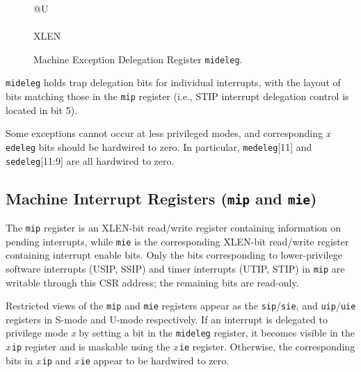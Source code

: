 \begin{figure}[h!]
{\footnotesize
\begin{center}
\begin{tabular}{@{}U}
 \\
\hline
{} \\
\hline
XLEN \\
\end{tabular}
\end{center}
}
\vspace{-0.1in}
\caption{Machine Exception Delegation Register {\tt mideleg}.}
\label{midelegreg}
\end{figure}

{\tt mideleg} holds trap delegation bits for individual interrupts, with the
layout of bits matching those in the {\tt mip} register (i.e., STIP interrupt
delegation control is located in bit 5).

Some exceptions cannot occur at less privileged modes, and corresponding
{\em x}\,{\tt edeleg} bits should be hardwired to zero.  In particular,
{\tt medeleg}[11] and {\tt sedeleg}[11:9] are all hardwired to zero.

\subsection{Machine Interrupt Registers ({\tt mip} and {\tt mie})}

The {\tt mip} register is an XLEN-bit read/write register containing
information on pending interrupts, while {\tt mie} is the
corresponding XLEN-bit read/write register containing interrupt enable
bits.  Only the bits corresponding to lower-privilege software
interrupts (USIP, SSIP) and timer interrupts (UTIP, STIP) in {\tt mip}
are writable through this CSR address; the remaining bits are
read-only.

Restricted views of the {\tt mip} and {\tt mie} registers appear as
the {\tt sip}/{\tt sie}, and {\tt uip}/{\tt uie} registers in 
S-mode and U-mode respectively.  If an interrupt is delegated to
privilege mode {\em x} by setting a bit in the {\tt mideleg} register,
it becomes visible in the {\em x}\,{\tt ip} register and is maskable
using the {\em x}\,{\tt ie} register.  Otherwise, the corresponding
bits in {\em x}\,{\tt ip} and {\em x}\,{\tt ie} appear to be hardwired
to zero.

